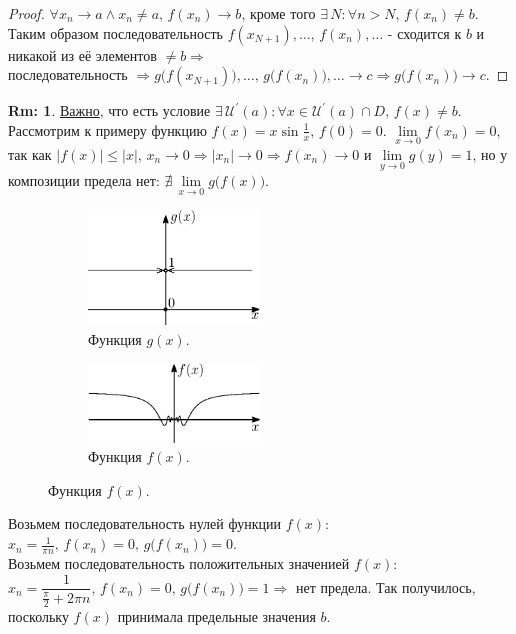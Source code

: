 \documentclass[12pt]{article}
\theoremstyle{definition}
\newtheorem{rem}{Rm:}
\begin{document}
\begin{proof}
	$\forall x_n \to a \wedge x_n \neq a, \, f(x_n) \to b$, кроме того $\exists \, N \colon \forall n > N, \, f(x_n) \neq b$. Таким образом последовательность $f(x_{N+1}), \dotsc, \, f(x_n), \dotsc$ - сходится к $b$ и никакой из её элементов $\neq b \Rightarrow$\\
	последовательность $\Rightarrow g\big(f(x_{N+1})\big), \dotsc, \, g\big(f(x_n)\big), \dotsc \to c \Rightarrow g\big(f(x_n) \big) \to c$.
\end{proof}

\begin{rem}
	\uline{Важно}, что есть условие $\exists \, \mathcal{U}^\prime(a) \colon \forall x \in \mathcal{U}^\prime(a) \cap D, \, f(x) \neq b$. Рассмотрим к примеру функцию $f(x) = x \sin{\frac{1}{x}}, \, f(0) = 0$. $\lim\limits_{x \to 0}f(x_n) = 0$, так как $|f(x)| \leq |x|, \, x_n \to 0 \Rightarrow |x_n| \to 0 \Rightarrow f(x_n) \to 0$ и $\lim\limits_{y\to 0}g(y) = 1$, но у композиции предела нет: $\nexists \, \lim\limits_{x \to 0} g\big( f(x)\big)$.
	\begin{figure}[H]
		\begin{subfigure}[b]{0.5\textwidth}
			\centering
			\includegraphics[width=0.5\textwidth]{14_9.eps}
			\caption{Функция $g(x)$.}
			\label{14_9}
		\end{subfigure}%
		\begin{subfigure}[b]{0.5\textwidth}
			\centering
			\includegraphics[width=0.5\textwidth]{14_10.eps}
			\caption{Функция $f(x)$.}
			\label{14_10}
		\end{subfigure}
	\end{figure}
	Возьмем последовательность нулей функции $f(x)$: $x_n = \frac{1}{\pi n}, \, f(x_n) = 0, \, g\big( f(x_n)\big) = 0$.\\
	Возьмем последовательность положительных значенией $f(x)$:  $x_n =\dfrac{1}{\frac{\pi}{2} + 2\pi n}, \, f(x_n) = 0, \, g\big( f(x_n)\big) = 1 \Rightarrow$ нет предела. Так получилось, поскольку $f(x)$ принимала предельные значения $b$.
\end{rem}
\end{document}
